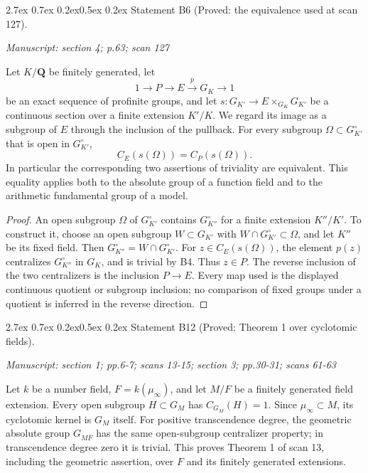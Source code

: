 \documentclass[11pt,a4paper]{article}
\makeatletter
\newcommand{\passage}[1]{\par\smallskip\noindent\textit{Manuscript: #1}\par\smallskip}
\renewcommand\paragraph{\@startsection{paragraph}{4}{\z@}%
  {2.7ex \@plus 0.7ex \@minus 0.2ex}{0.5ex \@plus 0.2ex}%
  {\normalfont\normalsize\bfseries}}
\makeatother
\begin{document}
\paragraph{Statement B6 (Proved: the equivalence used at scan 127).}\label{res:B6}
\passage{section 4; p.63; scan 127}

Let $K/\mathbf Q$ be finitely generated, let
\[
 1\longrightarrow P\longrightarrow E\xrightarrow{p}G_K\longrightarrow1
\]
be an exact sequence of profinite groups, and let
$s:G_{K'}\to E\times_{G_K}G_{K'}$ be a continuous section over a finite
extension $K'/K$. We regard its image as a subgroup of $E$ through the
inclusion of the pullback. For every subgroup $\Omega\subset G_{K'}^\circ$
that is open in $G_{K'}^\circ$,
\[
 C_E(s(\Omega))=C_P(s(\Omega)).
\]
In particular the corresponding two assertions of triviality are
equivalent. This equality applies both to the absolute group of a
function field and to the arithmetic fundamental group of a model.

\begin{proof}
An open subgroup $\Omega$ of $G_{K'}^\circ$ contains
$G_{K''}^\circ$ for a finite extension $K''/K'$.
To construct it, choose an open subgroup $W\subset G_{K'}$ with
$W\cap G_{K'}^\circ\subset\Omega$, and let $K''$ be its fixed field.
Then $G_{K''}^\circ=W\cap G_{K'}^\circ$. For
$z\in C_E(s(\Omega))$, the element $p(z)$ centralizes
$G_{K''}^\circ$ in $G_K$, and is trivial by B4. Thus $z\in P$.
The reverse inclusion of the two centralizers is the inclusion $P\to E$.
Every map used is the displayed continuous quotient or subgroup inclusion;
no comparison of fixed groups under a quotient is inferred in the reverse
direction.
\end{proof}

\paragraph{Statement B12 (Proved: Theorem 1 over cyclotomic fields).}\label{res:B12}
\passage{section 1; pp.6-7; scans 13-15; section 3; pp.30-31; scans 61-63}

Let $k$ be a number field, $F=k(\mu_\infty)$, and let $M/F$ be a finitely
generated field extension. Every open subgroup $H\subset G_M$ has
$C_{G_M}(H)=1$. Since $\mu_\infty\subset M$, its cyclotomic kernel is
$G_M$ itself. For positive transcendence degree, the geometric absolute
group $G_{M\overline F}$ has the same open-subgroup centralizer property;
in transcendence degree zero it is trivial. This proves Theorem 1 of scan
13, including the geometric assertion, over $F$ and its finitely generated
extensions.
\end{document}

